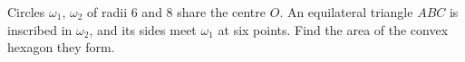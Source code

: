 Circles $\omega_1$, $\omega_2$ of radii $6$ and $8$ share the centre $O$. An equilateral triangle $ABC$ is inscribed in $\omega_2$, and its sides meet $\omega_1$ at six points. Find the area of the convex hexagon they form.

